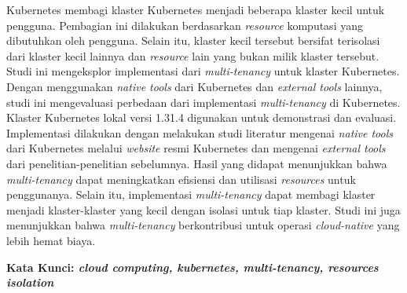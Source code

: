 Kubernetes membagi klaster Kubernetes menjadi beberapa klaster
kecil untuk pengguna. Pembagian ini dilakukan berdasarkan \emph{resource} komputasi
yang dibutuhkan oleh pengguna. Selain itu, klaster kecil tersebut bersifat terisolasi
dari klaster kecil lainnya dan \emph{resource} lain yang bukan milik klaster tersebut.
Studi ini mengeksplor implementasi dari \emph{multi-tenancy} untuk klaster Kubernetes. Dengan menggunakan \emph{native tools}
dari Kubernetes dan \emph{external tools} lainnya, studi ini mengevaluasi perbedaan dari implementasi \emph{multi-tenancy} di Kubernetes.
Klaster Kubernetes lokal versi 1.31.4 digunakan untuk demonstrasi dan evaluasi. Implementasi
dilakukan dengan melakukan studi literatur mengenai \emph{native tools} dari Kubernetes melalui
\emph{website} resmi Kubernetes dan mengenai \emph{external tools} dari penelitian-penelitian sebelumnya.
Hasil yang didapat menunjukkan bahwa \emph{multi-tenancy} dapat meningkatkan efisiensi dan
utilisasi \emph{resources} untuk penggunanya. Selain itu, implementasi \emph{multi-tenancy} dapat membagi
klaster menjadi klaster-klaster yang kecil dengan isolasi untuk tiap klaster.
Studi ini juga menunjukkan bahwa \emph{multi-tenancy} berkontribusi untuk operasi \emph{cloud-native} yang lebih hemat biaya.

\vspace{2ex}
\noindent
\textbf{Kata Kunci: \emph{cloud computing, kubernetes, multi-tenancy, resources isolation}}
